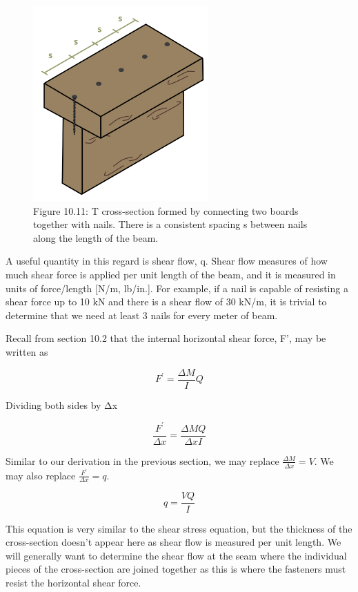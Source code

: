 \documentclass[
  letterpaper,
  DIV=11,
  numbers=noendperiod]{scrreprt}
\theoremstyle{definition}
\theoremstyle{remark}
\begin{document}
\begin{figure}[H]

{\centering \includegraphics[width=2.64583in,height=\textheight]{images/CH10 PNGs/figure 10.11.png}

}

\caption{Figure 10.11: T cross-section formed by connecting two boards
together with nails. There is a consistent spacing s between nails along
the length of the beam.}

\end{figure}%

A useful quantity in this regard is shear flow, q. Shear flow measures
of how much shear force is applied per unit length of the beam, and it
is measured in units of force/length {[}N/m, lb/in.{]}. For example, if
a nail is capable of resisting a shear force up to 10 kN and there is a
shear flow of 30 kN/m, it is trivial to determine that we need at least
3 nails for every meter of beam.

Recall from section 10.2 that the internal horizontal shear force, F',
may be written as

\[
F^{\prime}=\frac{\Delta M}{I} Q
\]

Dividing both sides by Δx

\[
\frac{F^{\prime}}{\Delta x}=\frac{\Delta M Q}{\Delta x I}
\]

Similar to our derivation in the previous section, we may replace
\(\frac{\Delta M}{\Delta x}=V\). We may also replace
\(\frac{F^{\prime}}{\Delta x}=q\).

\[
q=\frac{V Q}{I}
\]

This equation is very similar to the shear stress equation, but the
thickness of the cross-section doesn't appear here as shear flow is
measured per unit length. We will generally want to determine the shear
flow at the seam where the individual pieces of the cross-section are
joined together as this is where the fasteners must resist the
horizontal shear force.
\end{document}
